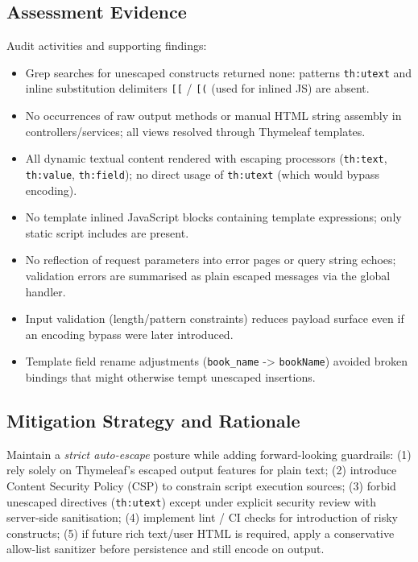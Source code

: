 \documentclass[]{UCD_CS_FYP_Report}
\begin{document}
\subsection*{Assessment Evidence}
Audit activities and supporting findings:
\begin{itemize}
 \item Grep searches for unescaped constructs returned none: patterns \texttt{th:utext} and inline substitution delimiters \texttt{[[} / \texttt{[(} (used for inlined JS) are absent.
 \item No occurrences of raw output methods or manual HTML string assembly in controllers/services; all views resolved through Thymeleaf templates.
 \item All dynamic textual content rendered with escaping processors (\texttt{th:text}, \texttt{th:value}, \texttt{th:field}); no direct usage of \texttt{th:utext} (which would bypass encoding).
 \item No template inlined JavaScript blocks containing template expressions; only static script includes are present.
 \item No reflection of request parameters into error pages or query string echoes; validation errors are summarised as plain escaped messages via the global handler.
 \item Input validation (length/pattern constraints) reduces payload surface even if an encoding bypass were later introduced.
 \item Template field rename adjustments (\texttt{book\_name} -> \texttt{bookName}) avoided broken bindings that might otherwise tempt unescaped insertions.
\end{itemize}

\subsection*{Mitigation Strategy and Rationale}
Maintain a \textit{strict auto-escape} posture while adding forward-looking guardrails: (1) rely solely on Thymeleaf's escaped output features for plain text; (2) introduce Content Security Policy (CSP) to constrain script execution sources; (3) forbid unescaped directives (\texttt{th:utext}) except under explicit security review with server-side sanitisation; (4) implement lint / CI checks for introduction of risky constructs; (5) if future rich text/user HTML is required, apply a conservative allow-list sanitizer before persistence and still encode on output.
\end{document}
